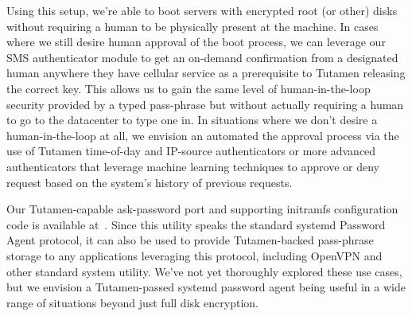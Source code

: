Using this setup, we're able to boot servers with encrypted root (or
other) disks without requiring a human to be physically present at the
machine. In cases where we still desire human approval of the boot
process, we can leverage our SMS authenticator module to get an
on-demand confirmation from a designated human anywhere they have
cellular service as a prerequisite to Tutamen releasing the correct
key. This allows us to gain the same level of human-in-the-loop
security provided by a typed pass-phrase but without actually
requiring a human to go to the datacenter to type one in. In
situations where we don't desire a human-in-the-loop at all, we
envision an automated the approval process via the use of Tutamen
time-of-day and IP-source authenticators or more advanced
authenticators that leverage machine learning techniques to approve or
deny request based on the system's history of previous requests.

Our Tutamen-capable ask-password port and supporting initramfs
configuration code is available
at~\cite{src-tutamen-askpassword}. Since this utility speaks the
standard systemd Password Agent protocol, it can also be used to
provide Tutamen-backed pass-phrase storage to any applications
leveraging this protocol, including OpenVPN and other standard system
utility. We've not yet thoroughly explored these use cases, but we
envision a Tutamen-passed systemd password agent being useful in a
wide range of situations beyond just full disk encryption.




